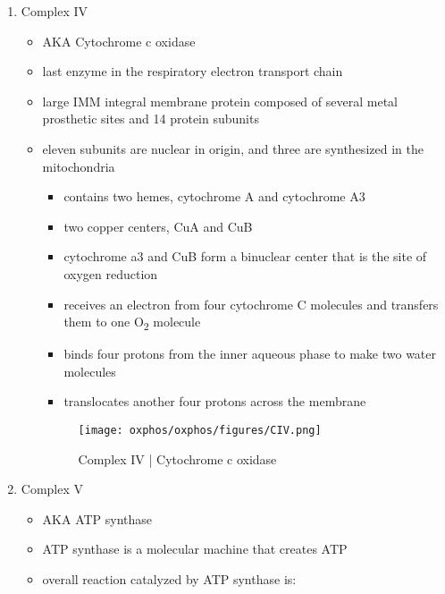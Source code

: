 \documentclass{scrartcl}
\begin{document}
\begin{enumerate}
\begin{itemize}
{\small{}}
\end{itemize}

\item Complex IV
\label{sec:orga925ab5}
\begin{itemize}
\item AKA Cytochrome c oxidase
\item last enzyme in the respiratory electron transport chain
\item large IMM integral membrane protein composed of several metal prosthetic sites and 14 protein subunits
\item eleven subunits are nuclear in origin, and three are synthesized in the mitochondria
\begin{itemize}
\item contains two hemes, cytochrome A and cytochrome A3
\item two copper centers, CuA and CuB
\item cytochrome a3 and CuB form a binuclear center that is the site of
oxygen reduction
\item receives an electron from four cytochrome C molecules and
transfers them to one O\textsubscript{2} molecule
\end{itemize}

{\small{}}

\begin{itemize}
\item binds four protons from the inner aqueous phase to make two water
molecules
\item translocates another four protons across the membrane
\end{itemize}

\begin{figure}[htbp]
\centering
\texttt{[image: oxphos/oxphos/figures/CIV.png]}
\caption[cIV]{\label{fig:org3d84070}Complex IV | Cytochrome c oxidase}
\end{figure}
\end{itemize}

\item Complex V
\label{sec:org526a5a5}
\begin{itemize}
\item AKA ATP synthase
\item ATP synthase is a molecular machine that creates ATP
\item overall reaction catalyzed by ATP synthase is:
\end{itemize}


\end{enumerate}
\end{document}
